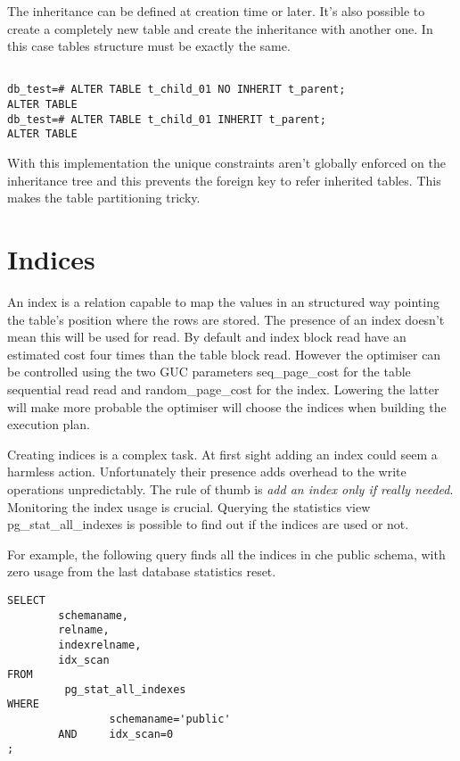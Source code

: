 The inheritance can be defined at creation time or later. It's also
possible to create a completely new table and create the inheritance with another one. In this
case tables structure must be exactly the same.

\begin{lstlisting}[style=pgsql]

db_test=# ALTER TABLE t_child_01 NO INHERIT t_parent;
ALTER TABLE
db_test=# ALTER TABLE t_child_01 INHERIT t_parent;
ALTER TABLE

\end{lstlisting}

With this implementation the unique constraints aren't globally enforced on the inheritance tree and
this prevents the foreign key to refer inherited tables. This makes the table partitioning tricky.

\section{Indices}
An index is a relation capable to map the values in an structured way pointing
the table's position where the rows are stored. The presence of an index 
doesn't mean this will be used for read. By default and index block read have 
an estimated cost four times than the table block read. However the optimiser
can be controlled using the two GUC parameters seq\_page\_cost for the table 
 sequential read read and random\_page\_cost for the index. Lowering the latter 
will make more probable the optimiser will choose the indices when building the 
execution plan.

Creating indices is a complex task. At first sight adding an index could seem a 
harmless action. Unfortunately their presence adds overhead to the write 
operations unpredictably. The rule of thumb is \textit{add an index only 
if really needed}. Monitoring the index usage is crucial. Querying the 
statistics view pg\_stat\_all\_indexes is possible to find out if the indices 
are used or not.

For example, the following query finds all the indices in che public 
schema, with zero usage from the last database statistics reset.

\begin{lstlisting}[style=pgsql]
SELECT
        schemaname,
        relname,
        indexrelname,
        idx_scan
FROM
         pg_stat_all_indexes
WHERE
                schemaname='public'
        AND     idx_scan=0
;


\end{lstlisting}



